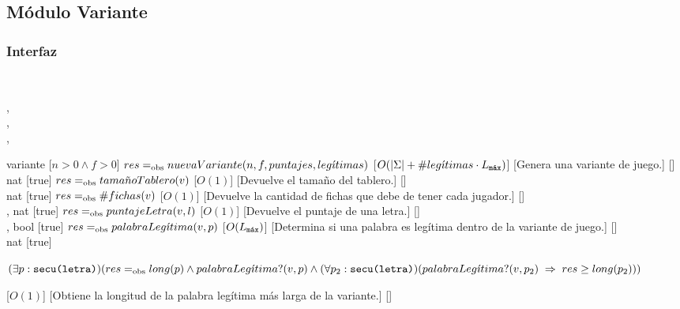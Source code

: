 \subsection{Módulo Variante}
\begin{interfaz}{\subsubsection{Interfaz}}
  \\
  \usa{\falta}
  \par\noindent
  \begin{operaciones}
    {
      \begin{adjustwidth}{2em}{}
      ,\\
      ,\\
      ,\\
      \end{adjustwidth}
    }{variante}
    [$n>0\land f>0$]
    {$res\igobs nuevaVariante(n,f,puntajes,leg\acute{\imath}timas)$}
    [$O(|\Sigma|+\#leg\acute{\imath}timas\cdot\Lmax)$]
    [Genera una variante de juego.]
    [\falta]\\

    \noindent{}
    {}{nat}
    [true]
    {$res\igobs tama\tilde{n}oTablero(v)$}
    [$O(1)$]
    [Devuelve el tamaño del tablero.]
    [\falta]\\

    \noindent{}
    {}{nat}
    [true]
    {$res\igobs \#fichas(v)$}
    [$O(1)$]
    [Devuelve la cantidad de fichas que debe de tener cada jugador.]
    [\falta]\\

    \noindent{}
    {, }{nat}
    [true]
    {$res\igobs puntajeLetra(v,l)$}
    [$O(1)$]
    [Devuelve el puntaje de una letra.]
    [\falta]\\

    \noindent{}
    {, }{bool}
    [true]
    {$res\igobs palabraLeg\acute{\imath}tima(v,p)$}
    [$O(\Lmax)$]
    [Determina si una palabra es legítima dentro de la variante de juego.]
    [\falta]\\

    \noindent{}
    {}{nat}
    [true]
    {
      \begin{adjustwidth}{2em}{}

      $(\exists p:\texttt{secu(letra)})(res\igobs long(p)\land palabraLeg\acute{\imath}tima?(v,p)\land\\(\forall p_{2}:\texttt{secu(letra)})( palabraLeg\acute{\imath}tima?(v,p_{2})\implies res\geq long(p_{2})))$
      \end{adjustwidth}
    }
    [$O(1)$]
    [Obtiene la longitud de la palabra legítima más larga de la variante.]
    [\falta]
  \end{operaciones}
\end{interfaz}
